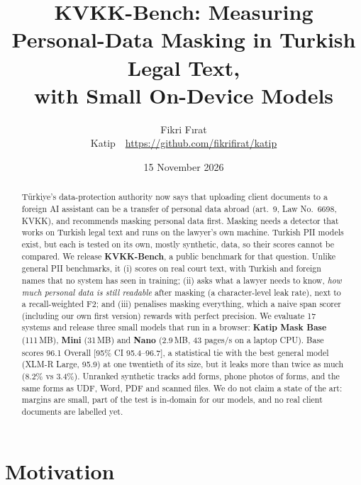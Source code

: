 \documentclass[10pt,twocolumn]{article}
\title{\textbf{KVKK-Bench: Measuring Personal-Data Masking in Turkish Legal Text,\\with Small On-Device Models}}
\author{Fikri F{\i}rat\\{\small Katip \,\textperiodcentered\, \url{https://github.com/fikrifirat/katip}}}
\date{15 November 2026}
\begin{document}
\maketitle

\begin{abstract}
Türkiye's data-protection authority now says that uploading client documents to a foreign AI assistant can be
a transfer of personal data abroad (art.~9, Law No.~6698, KVKK), and recommends masking personal data first.
Masking needs a detector that works on Turkish legal text and runs on the lawyer's own machine. Turkish PII
models exist, but each is tested on its own, mostly synthetic, data, so their scores cannot be compared.
We release \textbf{KVKK-Bench}, a public benchmark for that question. Unlike general PII benchmarks, it
(i) scores on real court text, with Turkish and foreign names that no system has seen in training;
(ii) asks what a lawyer needs to know, \emph{how much personal data is still readable} after masking
(a character-level leak rate), next to a recall-weighted F2; and (iii) penalises masking everything, which a naive span
scorer (including our own first version) rewards with perfect precision. We evaluate 17 systems and release three small models that run in a
browser: \textbf{Katip Mask Base} (111\,MB), \textbf{Mini} (31\,MB) and \textbf{Nano} (2.9\,MB, 43 pages/s on a
laptop CPU). Base scores 96.1 Overall [95\% CI 95.4--96.7], a statistical tie with the best general model
(XLM-R Large, 95.9) at one twentieth of its size, but it leaks more than twice as much (8.2\% vs 3.4\%).
Unranked synthetic tracks add forms, phone photos of forms, and the same forms as UDF, Word, PDF and scanned
files. We do not claim a state of the art: margins are small, part of the test is in-domain for our models, and
no real client documents are labelled yet.
\end{abstract}

\section{Motivation}
\label{sec:motivation}
\end{document}
